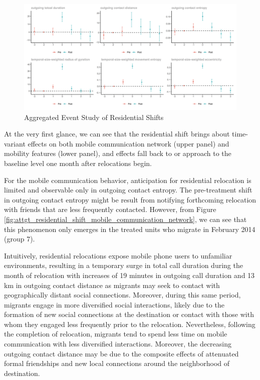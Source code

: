 \begin{figure}[h!]
\centering
\caption{Aggregated Event Study of Residential Shifts}
\vspace{0.1cm}

\includegraphics[scale=0.49]{figures/csdid/residential_shift.png}

\label{fig:event_study_residential_shift}
\end{figure}

At the very first glance, we can see that the residential shift brings about time-variant effects on both mobile communication network (upper panel) and mobility features (lower panel), and effects fall back to or approach to the baseline level one month after relocations begin.

For the mobile communication behavior, anticipation for residential relocation is limited and observable only in outgoing contact entropy.
The pre-treatment shift in outgoing contact entropy might be result from notifying forthcoming relocation with friends that are less frequently contacted.
However, from Figure \ref{fig:attgt_residential_shift_mobile_communication_network}, we can see that this phenomenon only emerges in the treated units who migrate in February 2014 (group 7).

Intuitively, residential relocations expose mobile phone users to unfamiliar environments, resulting in a temporary surge in total call duration during the month of relocation with increases of 19 minutes in outgoing call duration and 13 km in outgoing contact distance as migrants may seek to contact with geographically distant social connections.
Moreover, during this same period, migrants engage in more diversified social interactions, likely due to the formation of new social connections at the destination or contact with those with whom they engaged less frequently prior to the relocation.
Nevertheless, following the completion of relocation, migrants tend to spend less time on mobile communication with less diversified interactions. Moreover, the decreasing outgoing contact distance may be due to the composite effects of attenuated formal friendships and new local connections around the neighborhood of destination.


